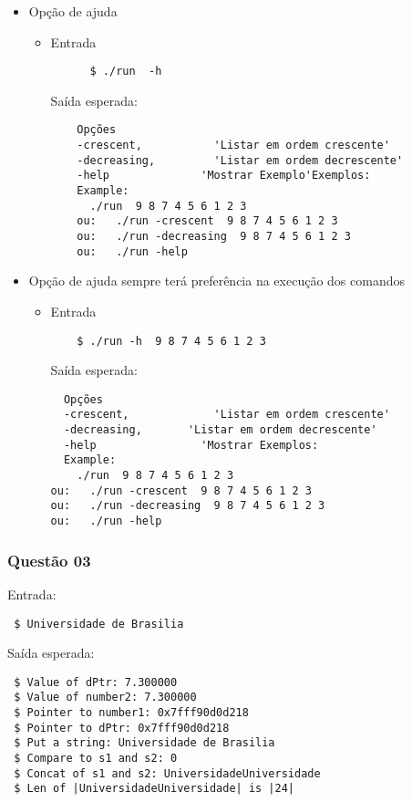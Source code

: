 \documentclass[11pt,a4paper]{article}
\begin{document}
\begin{itemize}
  \item Opção de ajuda
  \begin{itemize}
    \item Entrada
    \begin{verbatim}
      $ ./run  -h
    \end{verbatim}
    Saída esperada:
    \begin{verbatim}
    Opções
    -crescent, 			 'Listar em ordem crescente'
    -decreasing, 		 'Listar em ordem decrescente'
    -help 		       'Mostrar Exemplo'Exemplos:
    Example:
      ./run  9 8 7 4 5 6 1 2 3
	ou:   ./run -crescent  9 8 7 4 5 6 1 2 3
	ou:	  ./run -decreasing  9 8 7 4 5 6 1 2 3
	ou:	  ./run -help
\end{verbatim}
\end{itemize}


\item Opção de ajuda sempre terá preferência na execução dos comandos
\begin{itemize}
  \item Entrada
  \begin{verbatim}
    $ ./run -h  9 8 7 4 5 6 1 2 3
  \end{verbatim}
  Saída esperada:
  \begin{verbatim}
  Opções
  -crescent, 			 'Listar em ordem crescente'
  -decreasing, 		 'Listar em ordem decrescente'
  -help 		       'Mostrar Exemplos:
  Example:
    ./run  9 8 7 4 5 6 1 2 3
ou:   ./run -crescent  9 8 7 4 5 6 1 2 3
ou:	  ./run -decreasing  9 8 7 4 5 6 1 2 3
ou:	  ./run -help
\end{verbatim}
\end{itemize}
\end{itemize}

\subsubsection{Questão 03}

Entrada:
\begin{verbatim}
 $ Universidade de Brasilia
\end{verbatim}
Saída esperada:
\begin{verbatim}
 $ Value of dPtr: 7.300000
 $ Value of number2: 7.300000
 $ Pointer to number1: 0x7fff90d0d218
 $ Pointer to dPtr: 0x7fff90d0d218
 $ Put a string: Universidade de Brasilia
 $ Compare to s1 and s2: 0
 $ Concat of s1 and s2: UniversidadeUniversidade
 $ Len of |UniversidadeUniversidade| is |24|
\end{verbatim}
\end{document}
